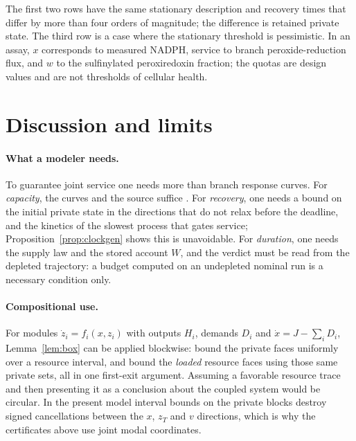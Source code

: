 \documentclass[11pt,a4paper]{article}
\theoremstyle{plain}
\theoremstyle{definition}
\theoremstyle{remark}
\begin{document}
The first two rows have the same stationary description and recovery times
that differ by more than four orders of magnitude; the difference is retained
private state. The third row is a case where the stationary threshold is
pessimistic. In an assay, $x$ corresponds to measured NADPH, service to branch
peroxide-reduction flux, and $w$ to the sulfinylated peroxiredoxin fraction;
the quotas are design values and are not thresholds of cellular health.

\section{Discussion and limits}\label{sec:discussion}

\paragraph{What a modeler needs.}
To guarantee joint service one needs more than branch response curves. For
\emph{capacity}, the curves and the source suffice \citep{companionNADPH}. For
\emph{recovery}, one needs a bound on the initial private state in the
directions that do not relax before the deadline, and the kinetics of the
slowest process that gates service; Proposition~\ref{prop:clockgen} shows this
is unavoidable. For \emph{duration}, one needs the supply law and the stored
account $W$, and the verdict must be read from the depleted trajectory: a
budget computed on an undepleted nominal run is a necessary condition only.

\paragraph{Compositional use.}
For modules $\dot z_i=f_i(x,z_i)$ with outputs $H_i$, demands $D_i$ and
$\dot x=J-\sum_iD_i$, Lemma~\ref{lem:box} can be applied blockwise: bound the
private faces uniformly over a resource interval, and bound the \emph{loaded}
resource faces using those same private sets, all in one first-exit argument.
Assuming a favorable resource trace and then presenting it as a conclusion
about the coupled system would be circular. In the present model interval
bounds on the private blocks destroy signed cancellations between the $x$,
$z_T$ and $v$ directions, which is why the certificates above use joint modal
coordinates.
\end{document}
